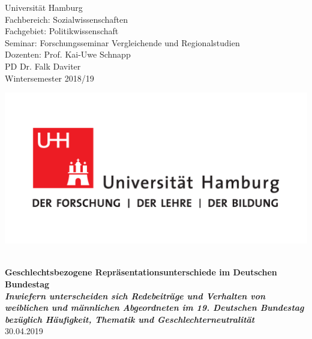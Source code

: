 \documentclass[12pt, 
    twoside=false, 
    bibliography=totoc, 
    numbers=endperiod, 
    headings=normal, 
    toc=chapterentrydotfill
    ]{scrbook}
\begin{document}
\begin{titlepage}
    \begin{minipage}[t]{0.6\textwidth}
    \flushleft 
    Universität Hamburg \\
    Fachbereich: Sozialwissenschaften \\
    Fachgebiet: Politikwissenschaft \\
    Seminar: Forschungsseminar Vergleichende und Regionalstudien \\ 
    Dozenten: Prof. Kai-Uwe Schnapp \\
    PD Dr. Falk Daviter \\
    Wintersemester 2018/19 \\
    \end{minipage}
    \hfill
    \begin{minipage}[t][1.7cm][b]{0.35\textwidth}
    \includegraphics[width=\textwidth]{images/UHH-Logo_2010_Farbe_CMYK.pdf}
    \end{minipage}
    
    \vspace*{\fill}
    \begin{center}
	\vspace{1cm} \vspace{0.2cm} \\
	\textbf{\Large Geschlechtsbezogene Repräsentationsunterschiede im Deutschen Bundestag \\
	\vspace {0,5cm} \small\emph{Inwiefern unterscheiden sich Redebeiträge und Verhalten von weiblichen und männlichen Abgeordneten im 19. Deutschen Bundestag bezüglich Häufigkeit, Thematik und Geschlechterneutralität}} \\
	\vspace{0.5cm}
	30.04.2019
	\end{center}
    \vspace*{\fill}
	

\end{titlepage}
\end{document}
